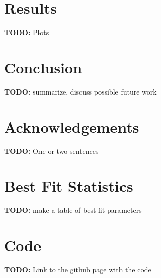 \documentclass[11pt]{amsart}
\begin{document}
\section{Results}\label{sec:results}
\textbf{TODO:} Plots

%

%

\section{Conclusion}\label{sec:conclustion}
\textbf{TODO:} summarize, discuss possible future work

\section*{Acknowledgements} 
\textbf{TODO:} One or two sentences

\newpage 
\appendix

\section{Best Fit Statistics}
\textbf{TODO:} make a table of best fit parameters

\section{Code}
\textbf{TODO:} Link to the github page with the code



\end{document}
